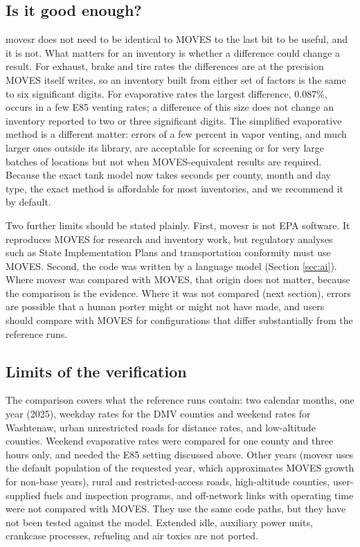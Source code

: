 \documentclass[preprint,
3p]{elsarticle} %
\begin{document}
\subsection{Is it good enough?}\label{is-it-good-enough}

movesr does not need to be identical to MOVES to the last bit to be
useful, and it is not. What matters for an inventory is whether a
difference could change a result. For exhaust, brake and tire rates the
differences are at the precision MOVES itself writes, so an inventory
built from either set of factors is the same to six significant digits.
For evaporative rates the largest difference, 0.087\%, occurs in a few
E85 venting rates; a difference of this size does not change an
inventory reported to two or three significant digits. The simplified
evaporative method is a different matter: errors of a few percent in
vapor venting, and much larger ones outside its library, are acceptable
for screening or for very large batches of locations but not when
MOVES-equivalent results are required. Because the exact tank model now
takes seconds per county, month and day type, the exact method is
affordable for most inventories, and we recommend it by default.

Two further limits should be stated plainly. First, movesr is not EPA
software. It reproduces MOVES for research and inventory work, but
regulatory analyses such as State Implementation Plans and
transportation conformity must use MOVES. Second, the code was written
by a language model (Section \ref{sec:ai}). Where movesr was compared
with MOVES, that origin does not matter, because the comparison is the
evidence. Where it was not compared (next section), errors are possible
that a human porter might or might not have made, and users should
compare with MOVES for configurations that differ substantially from the
reference runs.

\subsection{Limits of the
verification}\label{limits-of-the-verification}

The comparison covers what the reference runs contain: two calendar
months, one year (2025), weekday rates for the DMV counties and weekend
rates for Washtenaw, urban unrestricted roads for distance rates, and
low-altitude counties. Weekend evaporative rates were compared for one
county and three hours only, and needed the E85 setting discussed above.
Other years (movesr uses the default population of the requested year,
which approximates MOVES growth for non-base years), rural and
restricted-access roads, high-altitude counties, user-supplied fuels and
inspection programs, and off-network links with operating time were not
compared with MOVES. They use the same code paths, but they have not
been tested against the model. Extended idle, auxiliary power units,
crankcase processes, refueling and air toxics are not ported.
\end{document}
